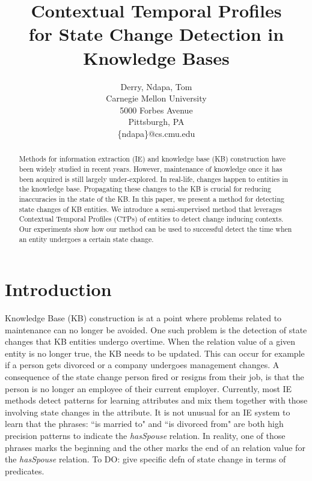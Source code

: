 \documentclass[11pt,a4paper]{article}
\title{Contextual Temporal Profiles\\ for State Change Detection in Knowledge Bases}
\author{Derry, Ndapa, Tom\\
Carnegie Mellon University\\ 5000 Forbes Avenue\\Pittsburgh, PA\\
  { \small
    \{ndapa\}@cs.cmu.edu}
}
\author{
}
\newcommand{\ignore}[1]{}
\renewcommand{\paragraph}[1]{\noindent\textbf{#1.}}
\newcommand{\highlight}[1]{{\color{red} #1}}
\begin{document}
\maketitle


\begin{abstract}
 Methods for information extraction (IE) and knowledge base (KB)
construction have been widely studied in recent years.  However,   maintenance of  knowledge once it has been acquired is still largely under-explored. In real-life, changes happen to entities in the knowledge base. Propagating  these changes to the KB is crucial for reducing inaccuracies in the  state of the KB. 
In this paper, we present a method for detecting 
state changes of KB entities.
We introduce a semi-supervised method that leverages Contextual Temporal Profiles (CTPs) of  entities to detect change inducing contexts. Our  experiments show how our method can be used to successful  detect the time when an entity undergoes a certain state change.

\end{abstract}
\section{Introduction}
%
Knowledge Base (KB) construction is at a point where  problems related to maintenance can no longer be avoided.   One such problem is the detection of state changes that KB entities undergo overtime. When the relation value of a given entity is no longer true, the KB needs to be updated.  This can occur for example if a person  gets divorced or a company undergoes management changes.  A consequence of the state change person  fired or resigns from their job,  is that the person is no longer an employee of their current employer. Currently, most IE methods detect patterns for learning attributes and mix them together with those involving state changes in the attribute.  It is not unusual for an IE system to learn that the phrases: ``is married to" and ``is divorced from"  are both high precision patterns to indicate the \textit{hasSpouse} relation. In reality,  one  of those phrases marks the beginning and the other marks the end of an relation value for the \textit{hasSpouse} relation.  \highlight{To DO: give specific defn of state change in terms of predicates.}\ignore{Specifically define what a state change is, change Given a relation R, an entity e, state change is when value acquires a new entity}
\end{document}
